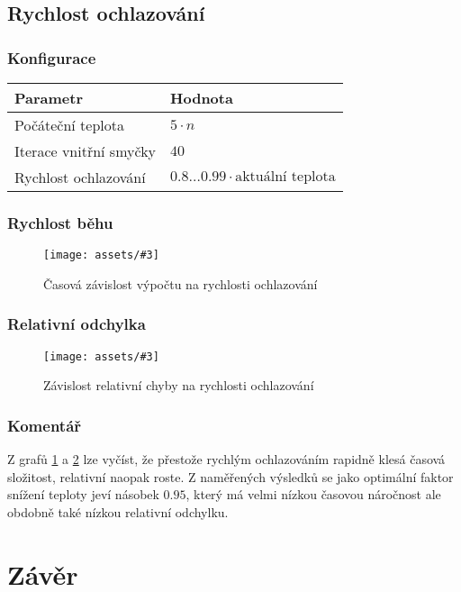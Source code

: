 \documentclass[czech]{article}
\newcommand{\image}[3]{
    \begin{figure}[H]
        \centering
        \texttt{[image: assets/\#3]}
        \caption{#2}
        \label{fig:#1}
    \end{figure}
}
\begin{document}
\subsection{Rychlost ochlazování}

\subsubsection*{Konfigurace}

\begin{tabular}{ | l | l | }
    \hline
    Parametr & Hodnota \\ \hline \hline
    Počáteční teplota & $5 \cdot n$ \\
    Iterace vnitřní smyčky & $40$ \\
    Rychlost ochlazování & $0.8\dots0.99 \cdot \textrm{aktuální teplota}$ \\ \hline
\end{tabular}

\subsubsection*{Rychlost běhu}

\image{dur-temperature-factor}{Časová závislost výpočtu na rychlosti ochlazování}{dur-temperature-factor.png}

\subsubsection*{Relativní odchylka}

\image{acc-temperature-factor}{Závislost relativní chyby na rychlosti ochlazování}{acc-temperature-factor.png}

\subsubsection*{Komentář}

Z grafů \ref{fig:dur-temperature-factor} a \ref{fig:acc-temperature-factor} lze vyčíst, že přestože rychlým ochlazováním rapidně klesá časová složitost, relativní naopak roste.
Z naměřených výsledků se jako optimální faktor snížení teploty jeví násobek $0.95$, který má velmi nízkou časovou náročnost ale obdobně také nízkou relativní odchylku.

\section{Závěr}
\end{document}
